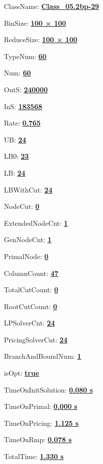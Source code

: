 \documentclass[11pt]{article}
\begin{document}
\pagestyle{empty}


ClassName: \underline{\textbf{Class_05.2bp-29}}
\par
BinSize: \underline{\textbf{100 × 100}}
\par
ReduceSize: \underline{\textbf{100 × 100}}
\par
TypeNum: \underline{\textbf{60}}
\par
Num: \underline{\textbf{60}}
\par
OutS: \underline{\textbf{240000}}
\par
InS: \underline{\textbf{183568}}
\par
Rate: \underline{\textbf{0.765}}
\par
UB: \underline{\textbf{24}}
\par
LB0: \underline{\textbf{23}}
\par
LB: \underline{\textbf{24}}
\par
LBWithCut: \underline{\textbf{24}}
\par
NodeCut: \underline{\textbf{0}}
\par
ExtendedNodeCnt: \underline{\textbf{1}}
\par
GenNodeCnt: \underline{\textbf{1}}
\par
PrimalNode: \underline{\textbf{0}}
\par
ColumnCount: \underline{\textbf{47}}
\par
TotalCutCount: \underline{\textbf{0}}
\par
RootCutCount: \underline{\textbf{0}}
\par
LPSolverCnt: \underline{\textbf{24}}
\par
PricingSolverCnt: \underline{\textbf{24}}
\par
BranchAndBoundNum: \underline{\textbf{1}}
\par
isOpt: \underline{\textbf{true}}
\par
TimeOnInitSolution: \underline{\textbf{0.080 s}}
\par
TimeOnPrimal: \underline{\textbf{0.000 s}}
\par
TimeOnPricing: \underline{\textbf{1.125 s}}
\par
TimeOnRmp: \underline{\textbf{0.078 s}}
\par
TotalTime: \underline{\textbf{1.330 s}}
\par
\newpage


\end{document}
